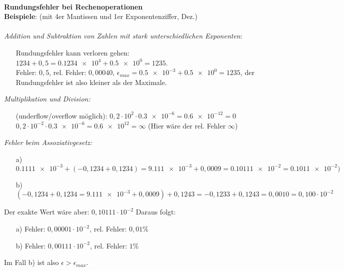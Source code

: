 \documentclass{scrartcl}
\begin{document}
\\
\textbf{Rundungsfehler bei Rechenoperationen}\\
\textbf{Beispiele}: (mit 4er Mantissen und 1er Exponentenziffer, Dez.)\\
\\
\textit{Addition und Subtraktion von Zahlen mit stark unterschiedlichen Exponenten}:
\begin{itemize}
\item[Rundungsfehler kann verloren gehen:]$1234+0,5=\SI{0,1234e4}+\SI{0,5e0}=1235$.\\
Fehler: $0,5$, rel. Fehler: $0,00040$, $\epsilon_{max}=\SI{0,5e-3}+\SI{0,5e0}=1235$, der Rundungsfehler ist also kleiner als der Maximale.
\end{itemize}
\textit{Multiplikation und Division:}
\begin{itemize}
\item[(underflow/overflow möglich):]
$0,2 \cdot 10^{2} \cdot \SI{0,3e-6}=\SI{0,6e-12}=0$\\
$0,2 \cdot 10^{-2} \cdot \SI{0,3e-6}=\SI{0,6e12}=\infty$ (Hier wäre der rel. Fehler $\infty$)
\end{itemize}
\textit{Fehler beim Assoziativgesetz:}
\begin{itemize}
\item[a)] $\SI{0,1111e-3}+(-0,1234+0,1234)=\SI{9,111e-3}+0,0009=\SI{0,10111e-2}=\SI{0,1011e-2})$
\item[b)]$(-0,1234+0,1234= \SI{9,111e-3}+0,0009)+0,1243=-0,1233+0,1243=0,0010=0,100 \cdot 10^{-2}
$\end{itemize}
Der exakte Wert wäre aber: $0,10111 \cdot 10^{-2}$
Daraus folgt:
\begin{itemize}
\item[a)]Fehler: $0,00001 \cdot 10^{-2}$, rel. Fehler: $0,01\%$
\item[b)]Fehler: $0,00111 \cdot 10^{-2}$, rel. Fehler: $1 \%$
\end{itemize}
Im Fall b) ist also $\epsilon>\epsilon_{max}$.
\end{document}

